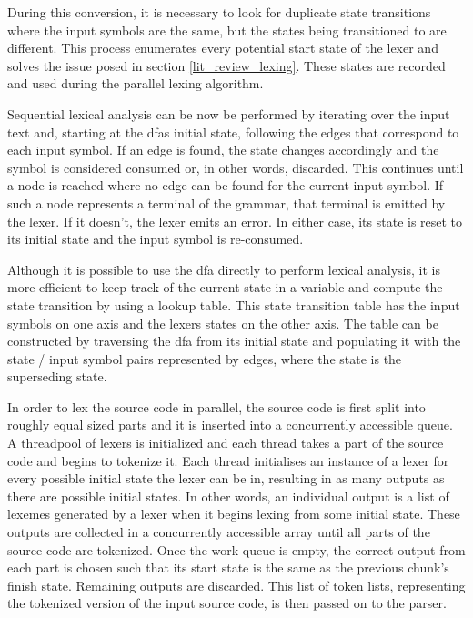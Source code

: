 During this conversion, it is necessary to look for duplicate state transitions
where the input symbols are the same, but the states being transitioned to are
different. This process enumerates every potential start state of the lexer
and solves the issue posed in section \ref{lit_review_lexing}. These states
are recorded and used during the parallel lexing algorithm. 

Sequential lexical analysis can be now be performed by iterating over the
input text and, starting at the \glspl{dfa} initial state, following the
edges that correspond to each input symbol. If an edge is found, the state
changes accordingly and the symbol is considered consumed or, in other words,
discarded. This continues until a node is reached where no edge can be found for
the current input symbol. If such a node represents a terminal of the grammar,
that terminal is emitted by the lexer.  If it doesn't, the lexer emits an error.
In either case, its state is reset to its initial state and the input symbol
is re-consumed.


Although it is possible to use the \gls{dfa} directly to perform lexical
analysis, it is more efficient to keep track of the current state in a variable
and compute the state transition by using a lookup table. This state transition
table has the input symbols on one axis and the lexers states on the other axis.
The table can be constructed by traversing the \gls{dfa} from its initial state
and populating it with the state / input symbol pairs represented by edges,
where the state is the superseding state.

In order to lex the source code in parallel, the source code is first split
into roughly equal sized parts and it is inserted into a concurrently accessible
queue. A threadpool of lexers is initialized and each thread takes a part of the
source code and begins to tokenize it. Each thread initialises an instance of
a lexer for every possible initial state the lexer can be in, resulting in as
many outputs as there are possible initial states. In other words, an individual
output is a list of lexemes generated by a lexer when it begins lexing from
some initial state. These outputs are collected in a concurrently accessible
array until all parts of the source code are tokenized. Once the work queue is
empty, the correct output from each part is chosen such that its start state is
the same as the previous chunk's finish state. Remaining outputs are discarded.
This list of token lists, representing the tokenized version of the input source
code, is then passed on to the parser.

